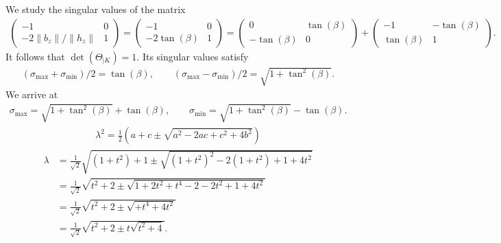 \documentclass[a4paper]{article}
\begin{document}
        \color{blue}
        We study the singular values of the matrix 
        \begin{align*}
            \begin{pmatrix}
            -1                 & 0
            \\ 
            -2 \|b_z\|/\|h_z\| & 1
            \end{pmatrix}
            =
            \begin{pmatrix}
            -1             & 0
            \\ 
            -2 \tan(\beta) & 1
            \end{pmatrix}
            =
            \begin{pmatrix}
            0             & \tan(\beta)
             \\ 
            -\tan(\beta) & 0
            \end{pmatrix}
            +
            \begin{pmatrix}
            -1           & -\tan(\beta)
             \\ 
            \tan(\beta) & 1
            \end{pmatrix}
            .
        \end{align*}
        It follows that $\det(\Theta_{|K}) = 1$. 
        Its singular values satisfy 
        \begin{align*}
            ( \sigma_{\max} + \sigma_{\min} )/2
            =
            \tan(\beta)
            ,
            \qquad 
            ( \sigma_{\max} - \sigma_{\min} )/2
            =
            \sqrt{ 1 + \tan^{2}(\beta) }
            .
        \end{align*}
        We arrive at 
        \begin{align*}
            \sigma_{\max} = \sqrt{ 1 + \tan^{2}(\beta) } + \tan(\beta)
            ,
            \qquad 
            \sigma_{\min} = \sqrt{ 1 + \tan^{2}(\beta) } - \tan(\beta)
            .
        \end{align*}
\begin{align*}
    \lambda^2 = \frac{1}{2} \left( a + c \pm \sqrt{ a^2 - 2 a c + c^2 + 4b^2 } \right)
\end{align*}
\begin{align*}
    \lambda 
    &= 
    \frac{1}{\sqrt 2} \sqrt{ (1+t^2) + 1 \pm \sqrt{ (1+t^2)^2 - 2 (1+t^2)   +   1 + 4t^2 } } 
    \\
    &= 
    \frac{1}{\sqrt 2} \sqrt{ t^2 + 2 \pm \sqrt{ 1 + 2t^2 + t^4 - 2 - 2 t^2 + 1 + 4t^2 } } 
    \\
    &= 
    \frac{1}{\sqrt 2} \sqrt{ t^2 + 2 \pm \sqrt{          + t^4                 + 4t^2 } } 
    \\
    &= 
    \frac{1}{\sqrt 2} \sqrt{ t^2 + 2 \pm t \sqrt{ t^2 + 4 } } 
    .
\end{align*}
\end{document}
